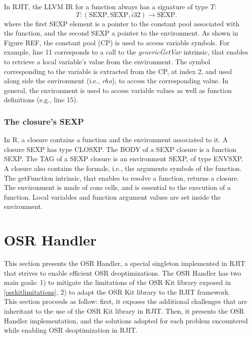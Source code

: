 In RJIT, the LLVM IR for a function always has a signature of type $T$:
$$T: (\text{SEXP}, \text{SEXP}, i32) \rightarrow \text{SEXP}.$$
where the first SEXP element is a pointer to the constant pool associated with the function, and the second SEXP a pointer to the environment.
As shown in Figure REF, the constant pool (CP) is used to access variable symbols. 
For example, line 11 corresponds to a call to the \textit{genericGetVar} intrinsic, that enables to retrieve a local variable's value from the environment.
The symbol corresponding to the variable is extracted from the CP, at index 2, and used along side the environment (i.e., \textit{rho}), to access the corresponding value.
In general, the environment is used to access variable values as well as function definitions (e.g., line 15).\\


\subsubsection{The closure's SEXP}
In R, a closure contains a function and the environment associated to it.
A closure SEXP has type CLOSXP.
The BODY of a SEXP closure is a function SEXP.
The TAG of a SEXP closure is an environment SEXP, of type ENVSXP.
A closure also contains the formals, i.e., the arguments symbols of the function.
The getFunction intrinsic, that enables to resolve a function, returns a closure.
The environment is made of cons cells, and is essential to the execution of a function.
Local variables and function argument values are set inside the environment.\\


\section{OSR Handler}
This section presents the OSR Handler, a special singleton implemented in RJIT that strives to enable efficient OSR deoptimizations. 
The OSR Handler has two main goals: 1) to mitigate the limitations of the OSR Kit\cite{OSRKit} library exposed in \ref{osrkitlimitations}, 2) to adapt the OSR Kit library to the RJIT framework.\\

This section proceeds as follow: first, it exposes the additional challenges that are inheritant to the use of the OSR Kit library in RJIT.
Then, it presents the OSR Handler implementation, and the solutions adopted for each problem encountered while enabling OSR deoptimization in RJIT.\\
 
